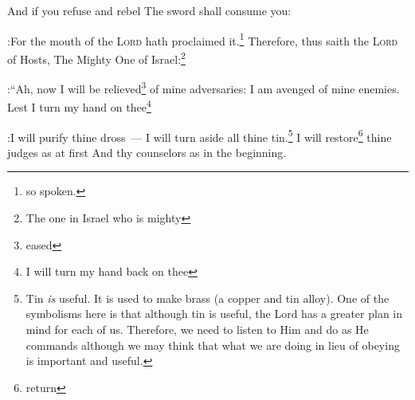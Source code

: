 
\begin{inparaenum}
    
    


    
    
     And if you refuse and rebel The sword shall consume you:%

:For the mouth of the \textsc{Lord} hath proclaimed it.\footnote{so spoken.}%
     Therefore, thus saith the \textsc{Lord} of Hosts, The Mighty One of Israel:\footnote{The one in Israel who is mighty}%

:``Ah, now I will be relieved\footnote{eased} of mine adversaries: I am avenged of mine enemies.%
     Lest I turn my hand on thee\footnote{I will turn my hand back on thee}%

:I will purify thine dross~--- I will turn aside all thine tin.\footnote{Tin \emph{is} useful. It is used to make brass (a copper and tin alloy). One of the symbolisms here is that although tin is useful, the Lord has a greater plan in mind for each of us. Therefore, we need to listen to Him and do as He commands although we may think that what we are doing in lieu of obeying is important and useful.}%
     I will restore\footnote{return} thine judges as at first And thy counselors as in the beginning.%


\end{inparaenum}
